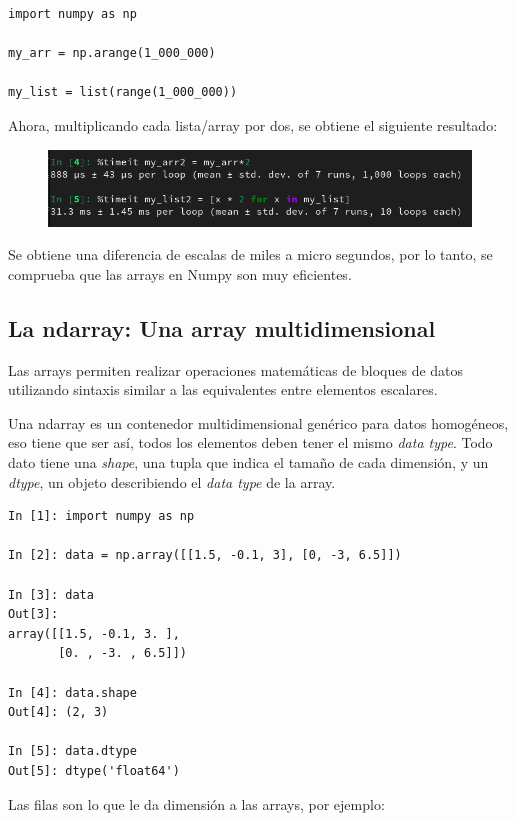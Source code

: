 \documentclass{article}
\begin{document}
\begin{lstlisting}[style=pythonstyle]
import numpy as np

my_arr = np.arange(1_000_000)

my_list = list(range(1_000_000))
\end{lstlisting}

Ahora, multiplicando cada lista/array por dos, se obtiene el siguiente resultado:

\begin{figure}[H]
  \centering
  \includegraphics[width=1\textwidth]{img/Img1.png}
\end{figure}

Se obtiene una diferencia de escalas de miles a micro segundos, por lo tanto, se comprueba que las arrays en Numpy son muy eficientes.

\subsection{La ndarray: Una array multidimensional}

Las arrays permiten realizar operaciones matemáticas de bloques de datos utilizando sintaxis similar a las equivalentes entre elementos escalares.

Una ndarray es un contenedor multidimensional genérico para datos homogéneos, eso tiene que ser así, todos los elementos deben tener el mismo \textit{data type}. Todo dato tiene una \textit{shape}, una tupla que indica el tamaño de cada dimensión, y un \textit{dtype}, un objeto describiendo el \textit{data type} de la array.

\begin{lstlisting}[style=pythonstyle]
In [1]: import numpy as np

In [2]: data = np.array([[1.5, -0.1, 3], [0, -3, 6.5]])

In [3]: data
Out[3]:
array([[1.5, -0.1, 3. ],
       [0. , -3. , 6.5]])

In [4]: data.shape
Out[4]: (2, 3)

In [5]: data.dtype
Out[5]: dtype('float64')
\end{lstlisting}

Las filas son lo que le da dimensión a las arrays, por ejemplo:
\end{document}
